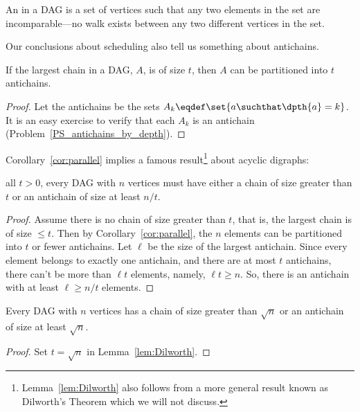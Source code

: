 \begin{definition}
An  in a DAG is a set of vertices such that any two
elements in the set are incomparable---no walk exists between any two
different vertices in the set.
\end{definition}

Our conclusions about scheduling also tell us something about antichains.

\begin{corollary}\label{cor:parallel}
If the largest chain in a DAG, $A$, is of size $t$,
then $A$ can be partitioned into $t$ antichains.
\end{corollary}

\begin{proof}
Let the antichains be the sets $A_k \eqdef \set{a \suchthat \dpth{a}
  =k}$.
It is an easy exercise to verify that each $A_k$ is an antichain
(Problem~\ref{PS_antichains_by_depth}).
\end{proof}

Corollary~\ref{cor:parallel} implies a famous
result\footnote{Lemma~\ref{lem:Dilworth} also follows from a more
  general result known as Dilworth's Theorem which we will not
  discuss.} about acyclic digraphs:

\begin{lemma}[Dilworth]\label{lem:Dilworth}
 all $t>0$, every DAG with
$n$ vertices must have either a chain of size greater than $t$ or an
antichain of size at least $n / t$.
\end{lemma}

\begin{proof}
Assume there is no chain of size greater than $t$, that is, the
largest chain is of size $\le t$.  Then by
Corollary~\ref{cor:parallel}, the $n$ elements can be partitioned into
$t$ or fewer antichains.  Let $\ell$ be the size of the largest
antichain.  Since every element belongs to exactly one antichain, and
there are at most $t$ antichains, there can't be more than $\ell t$
elements, namely, $\ell t \geq n$.  So, there is an antichain with at
least $\ell \geq n / t$ elements.
\end{proof}

\begin{corollary}\label{cor:Dilworth}
Every DAG with $n$ vertices has a chain of size greater
than $\sqrt{n}$ or an antichain of size at least $\sqrt{n}$.

\begin{proof}
  Set $t = \sqrt{n}$ in Lemma~\ref{lem:Dilworth}.
\end{proof}
\end{corollary}

